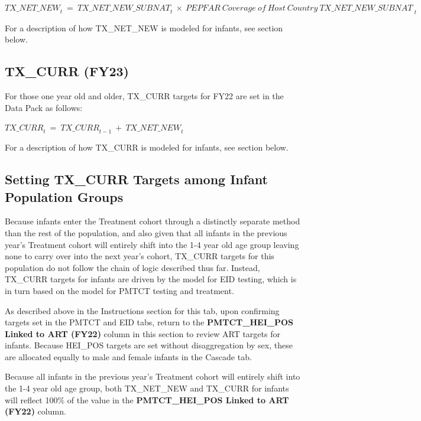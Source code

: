 \documentclass[
  openany]{book}
\begin{document}
\begin{center} ${TX\_ NET\_ NEW}_{t}\  = \ {TX\_ NET\_ NEW\_ SUBNAT}_{t}\  \times \ {PEPFAR\ Coverage\ of\ Host\ Country\ TX\_ NET\_ NEW\_ SUBNAT\ }_{t}\ $ \end{center}

For a description of how TX\_NET\_NEW is modeled for infants, see section
below.

\hypertarget{tx_curr-fy23}{%
\subsection{TX\_CURR (FY23)}\label{tx_curr-fy23}}

For those one year old and older, TX\_CURR targets for FY22 are set in
the Data Pack as follows:

\begin{center} ${TX\_ CURR}_{t}\  = \ {TX\_ CURR}_{t - 1}\  + \ {TX\_ NET\_ NEW}_{t}$ \end{center}

For a description of how TX\_CURR is modeled for infants, see section
below.

\hypertarget{setting-tx_curr-targets-among-infant-population-groups}{%
\subsection{Setting TX\_CURR Targets among Infant Population Groups}\label{setting-tx_curr-targets-among-infant-population-groups}}

Because infants enter the Treatment cohort through a distinctly separate
method than the rest of the population, and also given that all infants
in the previous year's Treatment cohort will entirely shift into the 1-4
year old age group leaving none to carry over into the next year's
cohort, TX\_CURR targets for this population do not follow the chain of
logic described thus far. Instead, TX\_CURR targets for infants are
driven by the model for EID testing, which is in turn based on the model
for PMTCT testing and treatment.

As described above in the Instructions section for this tab, upon
confirming targets set in the PMTCT and EID tabs, return to the
\textbf{PMTCT\_HEI\_POS Linked to ART (FY22)} column in this section to review
ART targets for infants. Because HEI\_POS targets are set without
disaggregation by sex, these are allocated equally to male and female
infants in the Cascade tab.

Because all infants in the previous year's Treatment cohort will
entirely shift into the 1-4 year old age group, both TX\_NET\_NEW and
TX\_CURR for infants will reflect 100\% of the value in the
\textbf{PMTCT\_HEI\_POS Linked to ART (FY22)} column.
\end{document}
